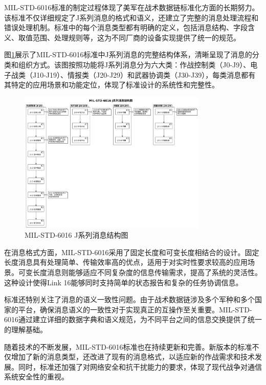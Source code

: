 MIL-STD-6016标准的制定过程体现了美军在战术数据链标准化方面的长期努力。该标准不仅详细规定了J系列消息的格式和语义，还建立了完整的消息处理流程和错误处理机制。标准中的每个消息类型都有明确的定义，包括消息结构、字段含义、取值范围、处理规则等，这为不同厂商的设备实现提供了统一的规范。

图\ref{fig_j_series_message_structure}展示了MIL-STD-6016标准中J系列消息的完整结构体系，清晰呈现了消息的分类和组织方式。该图按照功能将J系列消息分为六大类：作战控制类（J0-J9）、电子战类（J10-J19）、情报类（J20-J29）和武器协调类（J30-J39），每类消息都有其特定的应用场景和功能定位，体现了标准设计的系统性和完整性。

\begin{figure}[H]
    \centering
    \includegraphics[width=0.8\textwidth,height=0.6\textheight,keepaspectratio]{chapters/fig-0/j_series_message_structure.png}
    \caption{MIL-STD-6016 J系列消息结构图}
    \label{fig_j_series_message_structure}
\end{figure}

在消息格式方面，MIL-STD-6016采用了固定长度和可变长度相结合的设计。固定长度消息具有处理简单、传输效率高的优点，适用于对实时性要求较高的应用场景。可变长度消息则能够适应不同复杂度的信息传输需求，提高了系统的灵活性。这种设计使得Link 16能够同时支持简单的状态报告和复杂的任务协调信息。

标准还特别关注了消息的语义一致性问题。由于战术数据链涉及多个军种和多个国家的平台，确保消息语义的一致性对于实现真正的互操作至关重要。MIL-STD-6016通过建立详细的数据字典和语义规范，为不同平台之间的信息交换提供了统一的理解基础。

随着技术的不断发展，MIL-STD-6016标准也在持续更新和完善。新版本的标准不仅增加了新的消息类型，还改进了现有的消息格式，以适应新的作战需求和技术发展。同时，标准还加强了对网络安全和抗干扰能力的要求，体现了现代战争对通信系统安全性的重视。

